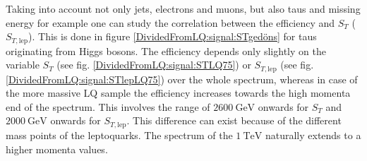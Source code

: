 %
Taking into account not only jets, electrons and muons, but also taus and missing energy for example one can study the correlation between the efficiency and $S_T$ ($S_{T,\text{lep}}$). This is done in figure \ref{DividedFromLQ:signal:STgedöns} for taus originating from Higgs bosons. The efficiency depends only slightly on the variable $S_T$ (see fig. \ref{DividedFromLQ:signal:STLQ75}) or $S_{T,\text{lep}}$ (see fig. \ref{DividedFromLQ:signal:STlepLQ75}) over the whole spectrum, whereas in case of the more massive LQ sample the efficiency increases towards the high momenta end of the spectrum. This involves the range of $\SI{2600}{\giga\electronvolt}$ onwards for $S_T$ and $\SI{2000}{\giga\electronvolt}$ onwards for $S_{T,\text{lep}}$. This difference can exist because of the different mass points of the leptoquarks. The spectrum of the $\SI{1}{\tera\electronvolt}$ naturally extends to a higher momenta values.\newline
%
